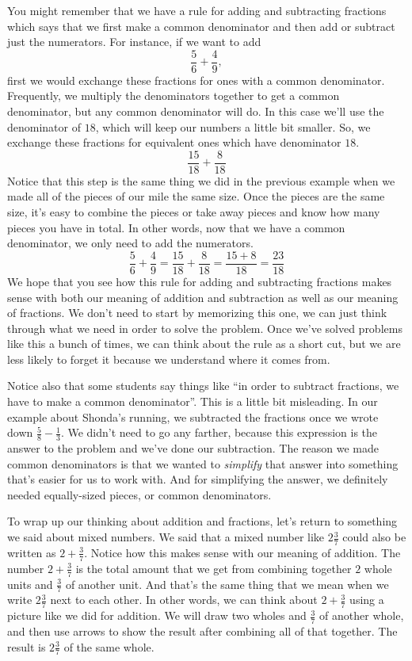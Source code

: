 \documentclass{ximera}
\begin{document}
You might remember that we have a rule for adding and subtracting fractions which says that we first make a common denominator and then add or subtract just the numerators. For instance, if we want to add
\[
\frac{5}{6} + \frac{4}{9}, 
\]
first we would exchange these fractions for ones with a common denominator. Frequently, we multiply the denominators together to get a common denominator, but any common denominator will do. In this case we'll use the denominator of $18$, which will keep our numbers a little bit smaller. So, we exchange these fractions for equivalent ones which have denominator $18$.
\[
\frac{15}{18} + \frac{8}{18}
\]
Notice that this step is the same thing we did in the previous example when we made all of the pieces of our mile the same size. Once the pieces are the same size, it's easy to combine the pieces or take away pieces and know how many pieces you have in total. In other words, now that we have a common denominator, we only need to add the numerators.
\[
\frac{5}{6} + \frac{4}{9} = \frac{15}{18} + \frac{8}{18} = \frac{15+8}{18} = \frac{23}{18}
\]
We hope that you see how this rule for adding and subtracting fractions makes sense with both our meaning of addition and subtraction as well as our meaning of fractions. We don't need to start by memorizing this one, we can just think through what we need in order to solve the problem. Once we've solved problems like this a bunch of times, we can think about the rule as a short cut, but we are less likely to forget it because we understand where it comes from.

Notice also that some students say things like ``in order to subtract fractions, we have to make a common denominator''. This is a little bit misleading. In our example about Shonda's running, we subtracted the fractions once we wrote down $\frac{5}{8} - \frac{1}{3}$. We didn't need to go any farther, because this expression is the answer to the problem and we've done our subtraction. The reason we made common denominators is that we wanted to \emph{simplify} that answer into something that's easier for us to work with. And for simplifying the answer, we definitely needed equally-sized pieces, or common denominators.


To wrap up our thinking about addition and fractions, let's return to something we said about mixed numbers. We said that a mixed number like $2 \frac{3}{7}$ could also be written as $2 + \frac{3}{7}$. Notice how this makes sense with our meaning of addition. The number $2 + \frac{3}{7}$ is the total amount that we get from combining together $2$ whole units and $\frac{3}{7}$ of another unit. And that's the same thing that we mean when we write $2 \frac{3}{7}$ next to each other. In other words, we can think about $2 + \frac{3}{7}$ using a picture like we did for addition. We will draw two wholes and $\frac{3}{7}$ of another whole, and then use arrows to show the result after combining all of that together. The result is $2 \frac{3}{7}$ of the same whole.
\end{document}
